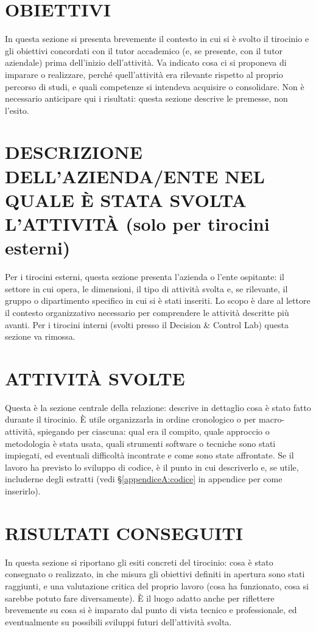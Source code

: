 \documentclass{00-settings/document}
\begin{document}
\maketitle
\section{OBIETTIVI}
In questa sezione si presenta brevemente il contesto in cui si è svolto il tirocinio e gli obiettivi concordati con il tutor accademico (e, se presente, con il tutor aziendale) prima dell'inizio dell'attività. Va indicato cosa ci si proponeva di imparare o realizzare, perché quell'attività era rilevante rispetto al proprio percorso di studi, e quali competenze si intendeva acquisire o consolidare. Non è necessario anticipare qui i risultati: questa sezione descrive le premesse, non l'esito.

\section{DESCRIZIONE DELL’AZIENDA/ENTE NEL QUALE È STATA SVOLTA L’ATTIVITÀ (solo per tirocini esterni)}
Per i tirocini esterni, questa sezione presenta l'azienda o l'ente ospitante: il settore in cui opera, le dimensioni, il tipo di attività svolta e, se rilevante, il gruppo o dipartimento specifico in cui si è stati inseriti. Lo scopo è dare al lettore il contesto organizzativo necessario per comprendere le attività descritte più avanti. Per i tirocini interni (svolti presso il Decision \& Control Lab) questa sezione va rimossa.

\section{ATTIVITÀ SVOLTE}
Questa è la sezione centrale della relazione: descrive in dettaglio cosa è stato fatto durante il tirocinio. È utile organizzarla in ordine cronologico o per macro-attività, spiegando per ciascuna: qual era il compito, quale approccio o metodologia è stata usata, quali strumenti software o tecniche sono stati impiegati, ed eventuali difficoltà incontrate e come sono state affrontate. Se il lavoro ha previsto lo sviluppo di codice, è il punto in cui descriverlo e, se utile, includerne degli estratti (vedi \S\ref{appendiceA:codice} in appendice per come inserirlo).

\section{RISULTATI CONSEGUITI}
In questa sezione si riportano gli esiti concreti del tirocinio: cosa è stato consegnato o realizzato, in che misura gli obiettivi definiti in apertura sono stati raggiunti, e una valutazione critica del proprio lavoro (cosa ha funzionato, cosa si sarebbe potuto fare diversamente). È il luogo adatto anche per riflettere brevemente su cosa si è imparato dal punto di vista tecnico e professionale, ed eventualmente su possibili sviluppi futuri dell'attività svolta.
\end{document}
